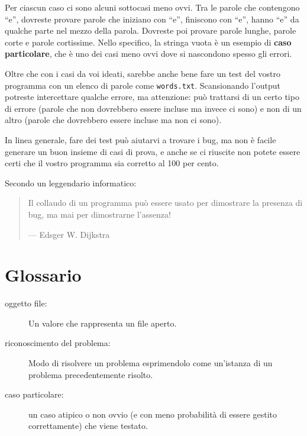 \documentclass[10pt]{book}
\begin{document}
Per ciascun caso ci sono alcuni sottocasi meno ovvi. Tra le parole che contengono ``e'', dovreste provare parole che iniziano con ``e'', finiscono con ``e'', hanno ``e'' da qualche parte nel mezzo della parola. Dovreste poi provare parole lunghe, parole corte e parole cortissime. Nello specifico, la stringa vuota è un esempio di {\bf caso particolare}, che è uno dei casi meno ovvi dove si nascondono spesso gli errori.

Oltre che con i casi da voi ideati, sarebbe anche bene fare un test del vostro programma con un elenco di parole come {\tt words.txt}.  Scansionando l'output potreste intercettare qualche errore, ma attenzione: può trattarsi di un certo tipo di errore (parole che non dovrebbero essere incluse ma invece ci sono) e non di un altro (parole che dovrebbero essere incluse ma non ci sono).

In linea generale, fare dei test può aiutarvi a trovare i bug, ma non è facile generare un buon insieme di casi di prova, e anche se ci riuscite non potete essere certi che il vostro programma sia corretto al 100 per cento.

Secondo un leggendario informatico:

\begin{quote}
Il collaudo di un programma può essere usato per dimostrare la presenza di bug, ma mai per dimostrarne l'assenza!

--- Edsger W. Dijkstra
\end{quote}


\section{Glossario}

\begin{description}

\item[oggetto file:] Un valore che rappresenta un file aperto.

\item[riconoscimento del problema:] Modo di risolvere un problema esprimendolo come un'istanza di un problema precedentemente risolto.

\item[caso particolare:] un caso atipico o non ovvio (e con meno probabilità di essere gestito correttamente) che viene testato.

\end{description}
\end{document}
